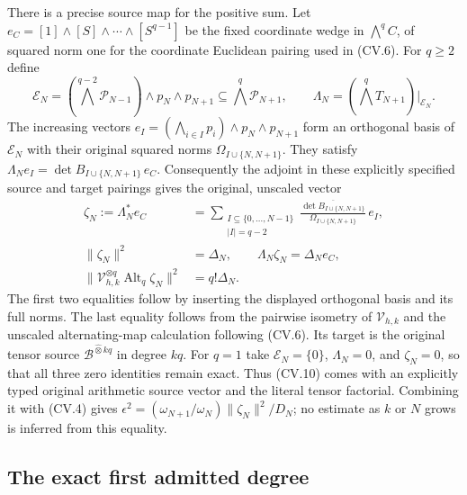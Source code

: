 There is a precise source map for the positive sum. Let
$e_C=[1]\wedge[S]\wedge\cdots\wedge[S^{q-1}]$ be the fixed
coordinate wedge in $\bigwedge^qC$, of squared norm one for the
coordinate Euclidean pairing used in (CV.6). For $q\geq2$ define
\[
 \mathcal E_N=(\bigwedge^{q-2}\mathcal P_{N-1})
                      \wedge p_N\wedge p_{N+1}
                 \subseteq\bigwedge^q\mathcal P_{N+1},
 \qquad
 \Lambda_N=(\bigwedge^qT_{N+1})|_{\mathcal E_N}.
\]
The increasing vectors
$e_I=(\bigwedge_{i\in I}p_i)\wedge p_N\wedge p_{N+1}$
form an orthogonal basis of $\mathcal E_N$ with their original
squared norms $\Omega_{I\cup\{N,N+1\}}$. They satisfy
$\Lambda_N e_I=\det B_{I\cup\{N,N+1\}}\,e_C$.
Consequently the adjoint in these explicitly specified source
and target pairings gives the original, unscaled vector
\[
 \begin{split}
 \zeta_N:=\Lambda_N^*e_C
 &=\sum_{\substack{I\subseteq\{0,\ldots,N-1\}\\ |I|=q-2}}
 \frac{\overline{\det B_{I\cup\{N,N+1\}}}}
      {\Omega_{I\cup\{N,N+1\}}}\,e_I,\\
 \|\zeta_N\|^2&=\Delta_N,\qquad
 \Lambda_N\zeta_N=\Delta_N e_C,\\
 \|\mathcal V_{h,k}^{\otimes q}
                \operatorname{Alt}_q\zeta_N\|^2
 &=q!\Delta_N.
 \end{split}
 \tag{CV.10a}
\]
The first two equalities follow by inserting the displayed
orthogonal basis and its full norms. The last equality follows
from the pairwise isometry of $\mathcal V_{h,k}$ and the
unscaled alternating-map calculation following (CV.6). Its
target is the original tensor source
$\mathscr B^{\widehat\otimes kq}$ in degree $kq$.
For $q=1$ take $\mathcal E_N=\{0\}$, $\Lambda_N=0$, and
$\zeta_N=0$, so that all three zero identities remain exact.
Thus (CV.10) comes with an explicitly typed original arithmetic
source vector and the literal tensor factorial. Combining it
with (CV.4) gives
$\epsilon^2=(\omega_{N+1}/\omega_N)\|\zeta_N\|^2/D_N$;
no estimate as $k$ or $N$ grows is inferred from this equality.

\subsection{The exact first admitted degree}

